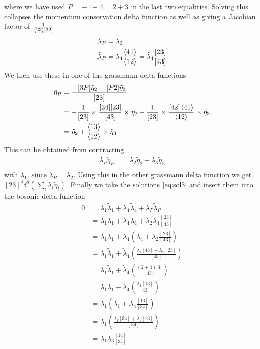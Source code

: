 \documentclass[a4paper,12pt]{article}
\begin{document}
where we have used $P=-1-4=2+3$ in the last two equalities. Solving this collapses the momentum conservation delta function as well as giving a Jacobian factor of $\frac{1}{\expval{23}[32]}$
\begin{equation} \label{eq:sol3}
	\begin{aligned}
		\lambda_P&=\lambda_2\\
		\tilde \lambda_P&=\lambda_4 \frac{\expval{41}}{\expval{12}}=\tilde\lambda_4 \frac{[23]}{[43]}
	\end{aligned}
\end{equation}
We then use these in one of the grassmann delta-functions
\begin{equation}
	\begin{aligned}
		\tilde\eta_{P}&=\frac{-[3P]\tilde\eta_{2}-[P 2]\tilde\eta_{3}}{[23]}\\
		&=-\frac{1}{[23]}\times \frac{[34][23]}{[43]} \times\tilde \eta_2-\frac{1}{[23]}\times \frac{[42]\expval{41}}{\expval{12}} \times\tilde \eta_3\\
		&=\tilde \eta_2+ \frac{\expval{13}}{\expval{12}} \times\tilde \eta_3\\
	\end{aligned}
\end{equation}
This can be obtained from contracting
\begin{equation}
	\begin{aligned}
\lambda_P\tilde\eta_{P}	&=\lambda_2\tilde \eta_2+ \lambda_3 \tilde \eta_3\\	
	\end{aligned}
\end{equation}
 with $\lambda_1$, since $\lambda_P=\lambda_2$. Using this in the other grassmann  delta function we get $[23]^4\delta^8(\sum_i\lambda_i\tilde\eta_i)$. Finally we take the solutions \eqref{eq:sol3} and insert them into the bosonic delta-function
 \begin{equation}
 	\begin{aligned}
 		0&=\lambda_1\tilde\lambda_1+\lambda_4\tilde\lambda_4+\lambda_P\tilde\lambda_P\\
 		&=\lambda_1\tilde\lambda_1+\lambda_4\tilde\lambda_4+\lambda_2\tilde\lambda_4  \frac{[23]}{[43]}\\
 		&=\lambda_1\tilde\lambda_1+\tilde\lambda_4 \left(\lambda_4+\lambda_2  \frac{[23]}{[43]}\right)
 		\\
 		&=\lambda_1\tilde\lambda_1+\tilde\lambda_4 \left(  \frac{\lambda_4[43]+\lambda_2[23]}{[43]}\right)
 		\\
 		&=\lambda_1\tilde\lambda_1+\tilde\lambda_4 \left(  \frac{(2+4)|3]}{[43]}\right)
 		\\
 		&=\lambda_1\tilde\lambda_1-\tilde\lambda_4 \left(  \frac{\lambda_1[13]}{[43]}\right)
 		\\
 		&=\lambda_1 \left(\tilde\lambda_1 +\tilde\lambda_4 \frac{[13]}{[34]}\right)
 			\\
 		&=\lambda_1 \left( \frac{\tilde\lambda_1[34]+\tilde\lambda_4[13]}{[34]}\right)
 			\\
 		&=\lambda_1 \tilde\lambda_3 \frac{[14]}{[34]}
 	\end{aligned}
 \end{equation}
\end{document}
